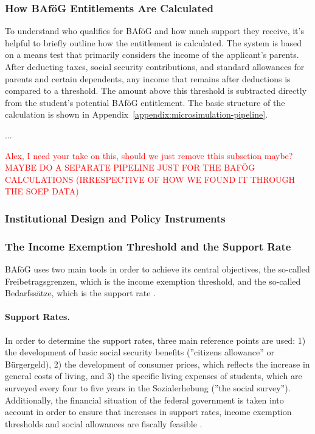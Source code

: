 \subsubsection{How BAföG Entitlements Are Calculated}
\label{subsection:how-bafog-entitlement-is-calculated}

To understand who qualifies for BAföG and how much support they receive, it's helpful to briefly outline how the entitlement is calculated. The system is based on a means test that primarily considers the income of the applicant’s parents. After deducting taxes, social security contributions, and standard allowances for parents and certain dependents, any income that remains after deductions is compared to a threshold. The amount above this threshold is subtracted directly from the student’s potential BAföG entitlement. 
The basic structure of the calculation is shown in Appendix~\ref{appendix:microsimulation-pipeline}.

...

\textcolor{red}{Alex, I need your take on this, should we just remove tthis subsction maybe? MAYBE DO A SEPARATE PIPELINE JUST FOR THE BAFÖG CALCULATIONS (IRRESPECTIVE OF HOW WE FOUND IT THROUGH THE SOEP DATA)}

\subsubsection{Institutional Design and Policy Instruments} 
\label{section:institutional-design-and-policy-instruments}

\subsubsection*{The Income Exemption Threshold and the Support Rate}
\label{subsection:the-income-exemption-threshold-and-the-support-rate}
BAföG uses two main tools in order to achieve its central objectives, the so-called Freibetragsgrenzen, which is the income exemption threshold, and the so-called Bedarfssätze, which is the support rate \citep{meier_bafog_2024}.

\paragraph{Support Rates.}
In order to determine the support rates, three main reference points are used: 1) the development of basic social security benefits (”citizens allowance” or Bürgergeld), 2) the development of consumer prices, which reflects the increase in general costs of living, and 3) the specific living expenses of students, which are surveyed every four to five years in the Sozialerhebung (”the social survey”). Additionally, the financial situation of the federal government is taken into account in order to ensure that increases in support rates, income exemption thresholds and social allowances are fiscally feasible \citep{meier_bafog_2024}.

